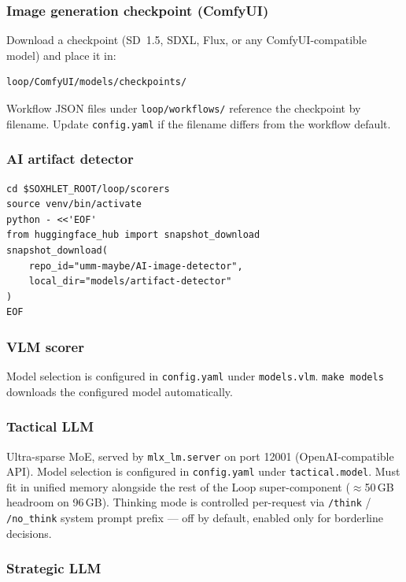 \documentclass[11pt,letterpaper]{article}
\begin{document}
\subsubsection{Image generation checkpoint (ComfyUI)}

Download a checkpoint (SD~1.5, SDXL, Flux, or any ComfyUI-compatible model)
and place it in:

\begin{lstlisting}[style=shell]
loop/ComfyUI/models/checkpoints/
\end{lstlisting}

Workflow JSON files under \texttt{loop/workflows/} reference the checkpoint
by filename. Update \texttt{config.yaml} if the filename differs from the
workflow default.

\subsubsection{AI artifact detector}

\begin{lstlisting}[style=shell]
cd $SOXHLET_ROOT/loop/scorers
source venv/bin/activate
python - <<'EOF'
from huggingface_hub import snapshot_download
snapshot_download(
    repo_id="umm-maybe/AI-image-detector",
    local_dir="models/artifact-detector"
)
EOF
\end{lstlisting}

\subsubsection{VLM scorer}

Model selection is configured in \texttt{config.yaml} under \texttt{models.vlm}.
\texttt{make models} downloads the configured model automatically.

\subsubsection{Tactical LLM}

Ultra-sparse MoE, served by \texttt{mlx\_lm.server} on port 12001
(OpenAI-compatible API). Model selection is configured in \texttt{config.yaml}
under \texttt{tactical.model}. Must fit in unified memory alongside the rest of
the Loop super-component ($\approx$50\,GB headroom on 96\,GB). Thinking mode is
controlled per-request via \texttt{/think} / \texttt{/no\_think} system prompt
prefix --- off by default, enabled only for borderline decisions.

\subsubsection{Strategic LLM}
\end{document}
